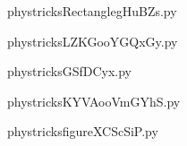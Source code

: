     

    \clearpage
    


    \newcommand{\CaptionFigRectanglegHuBZs}{<+Type your caption here+>}
    \begin{center}
        
    \end{center}
    phystricksRectanglegHuBZs.py

    

    \clearpage
    


    \newcommand{\CaptionFigLZKGooYGQxGy}{<+Type your caption here+>}
    \begin{center}
        
    \end{center}
    phystricksLZKGooYGQxGy.py

    

    \clearpage
    


    \newcommand{\CaptionFigGSfDCyx}{<+Type your caption here+>}
    \begin{center}
        
    \end{center}
    phystricksGSfDCyx.py

    

    \clearpage
    


    \newcommand{\CaptionFigKYVAooVmGYhS}{<+Type your caption here+>}
    \begin{center}
        
    \end{center}
    phystricksKYVAooVmGYhS.py

    

    \clearpage
    


    \newcommand{\CaptionFigfigureXCScSiP}{<+Type your caption here+>}
    \begin{center}
        
    \end{center}
    phystricksfigureXCScSiP.py

    

    \clearpage
    


